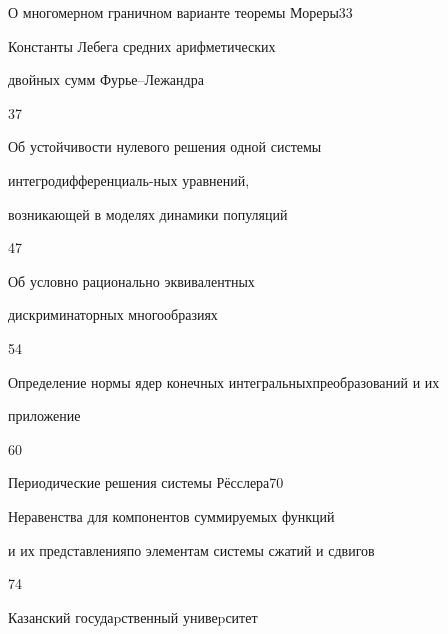 

{О многомерном граничном варианте теоремы Мореры}{33}




{Константы Лебега средних арифметических 


двойных сумм Фурье--Лежандра}{37}




{Об устойчивости нулевого решения одной системы 


интегродифференциаль-\newline ных уравнений,


возникающей в моделях динамики популяций}{47}




{Об условно рационально эквивалентных


дискриминаторных многообразиях}{54}




{Определение нормы ядер конечных интегральных\newline преобразований и их 


приложение}{60}




{Периодические решения системы Р\"е{}сслера}{70}




{Неравенства для компонентов суммируемых функций


и их представления\newline по элементам системы сжатий и сдвигов}{74}








\vfill


\noindent\raisebox{2pt}{\copyright} Казанский госудаpственный унивеpситет





